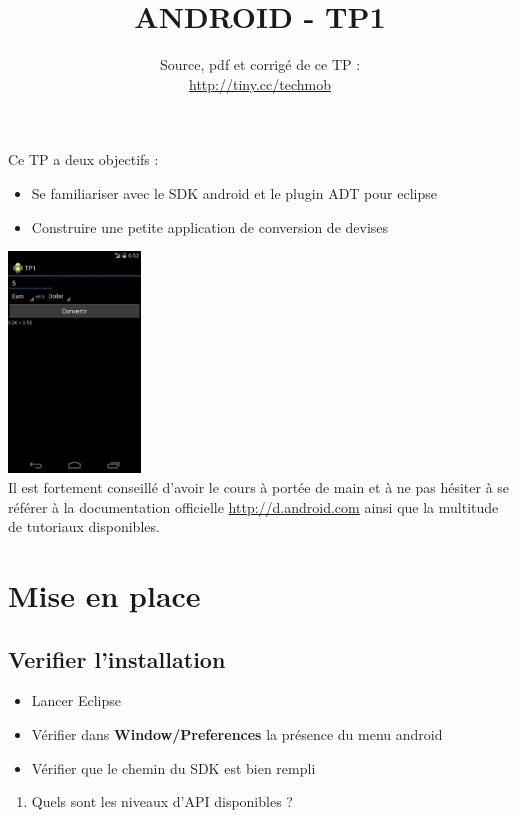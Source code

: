 \documentclass{article}
\title{ANDROID - TP1}
\date{Source, pdf et corrigé de ce TP
:\\\href{http://tiny.cc/techmob}{http://tiny.cc/techmob}}
\begin{document}
\maketitle
Ce TP a deux objectifs :
\begin{itemize}
\item Se familiariser avec le SDK android et le plugin ADT pour eclipse
\item Construire une petite application de conversion de devises
\end{itemize}
\includegraphics[width=100pt]{img/tp1.png}\\
Il est fortement conseillé d'avoir le cours à portée de main et à ne pas hésiter
à se référer à la documentation officielle
\href{http://d.android.com}{http://d.android.com} ainsi que la multitude de tutoriaux disponibles.
\section{Mise en place}
\subsection{Verifier l'installation}
\begin{itemize}
\item Lancer Eclipse
\item Vérifier dans \textbf{Window/Preferences} la présence du menu android
\item Vérifier que le chemin du SDK est bien rempli
\end{itemize}
\begin{enumerate}
\item Quels sont les niveaux d'API disponibles ?
\end{enumerate}
\end{document}
